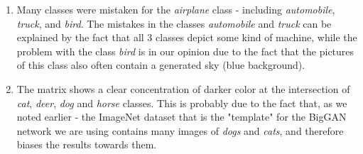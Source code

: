 \documentclass[12pt,a4paper,openany]{book}
\begin{document}
\begin{enumerate}
\item Many classes were mistaken for the \textit{airplane} class - including \textit{automobile}, \textit{truck}, and \textit{bird}. The mistakes in the classes \textit{automobile} and \textit{truck} can be explained by the fact that all 3 classes depict some kind of machine, while the problem with the class \textit{bird} is in our opinion due to the fact that the pictures of this class also often contain a generated sky (blue background).
\item The matrix shows a clear concentration of darker color at the intersection of \textit{cat}, \textit{deer}, \textit{dog} and \textit{horse} classes. This is probably due to the fact that, as we noted earlier - the ImageNet dataset that is the "template" for the BigGAN network we are using contains many images of \textit{dogs} and \textit{cats}, and therefore biases the results towards them.
\end{enumerate}
\end{document}
